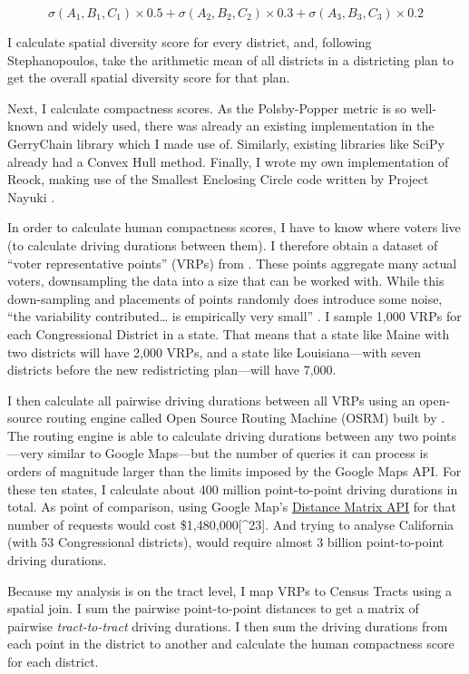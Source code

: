 \documentclass[]{article}
\begin{document}
\[ \sigma(A_1, B_1, C_1) \times 0.5 + \sigma(A_2, B_2, C_2) \times 0.3 + \sigma(A_3,
B_3, C_3) \times 0.2\]

I calculate spatial diversity score for every district, and, following
Stephanopoulos, take the arithmetic mean of all districts in a
districting plan to get the overall spatial diversity score for that
plan.

Next, I calculate compactness scores. As the Polsby-Popper metric is so
well-known and widely used, there was already an existing implementation
in the GerryChain library which I made use of. Similarly, existing
libraries like SciPy already had a Convex Hull method. Finally, I wrote
my own implementation of Reock, making use of the Smallest Enclosing
Circle code written by Project Nayuki \citep{nayuki2020}.

In order to calculate human compactness scores, I have to know where
voters live (to calculate driving durations between them). I therefore
obtain a dataset of ``voter representative points'' (VRPs) from
\cite{er2019}. These points aggregate many actual voters, downsampling
the data into a size that can be worked with. While this down-sampling
and placements of points randomly does introduce some noise, ``the
variability contributed\ldots{} is empirically very small''
\citep{er2019}. I sample 1,000 VRPs for each Congressional District in a
state. That means that a state like Maine with two districts will have
2,000 VRPs, and a state like Louisiana---with seven districts before the
new redistricting plan---will have 7,000.

I then calculate all pairwise driving durations between all VRPs using
an open-source routing engine called Open Source Routing Machine (OSRM)
built by \cite{osrm}. The routing engine is able to calculate driving
durations between any two points---very similar to Google Maps---but the
number of queries it can process is orders of magnitude larger than the
limits imposed by the Google Maps API. For these ten states, I calculate
about 400 million point-to-point driving durations in total. As point of
comparison, using Google Map's
\href{https://developers.google.com/maps/documentation/distance-matrix/usage-and-billing}{Distance
Matrix API} for that number of requests would cost
\$1,480,000{[}\^{}23{]}. And trying to analyse California (with 53
Congressional districts), would require almost 3 billion point-to-point
driving durations.

Because my analysis is on the tract level, I map VRPs to Census Tracts
using a spatial join. I sum the pairwise point-to-point distances to get
a matrix of pairwise \emph{tract-to-tract} driving durations. I then sum
the driving durations from each point in the district to another and
calculate the human compactness score for each district.
\end{document}
